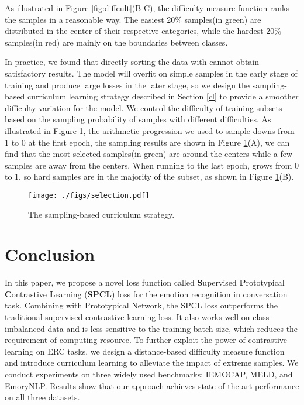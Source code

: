 \documentclass[11pt]{article}
\begin{document}
As illustrated in Figure \ref{fig:diffcult}(B-C), the difficulty measure function  ranks the samples in a reasonable way. The easiest 20\% samples(in green) are distributed in the center of their respective categories, while the hardest 20\% samples(in red) are mainly on the boundaries between classes. 

In practice, we found that directly sorting the data with  cannot obtain satisfactory results. The model will overfit on simple samples in the early stage of training and produce large losses in the later stage, so we design the sampling-based curriculum learning strategy described in Section \ref{cl} to provide a smoother difficulty variation for the model. We control the difficulty of training subsets based on the sampling probability of samples with different difficulties.  As illustrated in Figure \ref{fig:selection}, the arithmetic progression  we used to sample downs from 1 to 0 at the first epoch, the sampling results are shown in Figure \ref{fig:selection}(A), we can find that the most selected samples(in green) are around the centers while a few samples are away from the centers. When running to the last epoch,  grows from 0 to 1, so hard samples are in the majority of the subset, as shown in Figure \ref{fig:selection}(B).

\begin{figure}[t]
    \centering
    \texttt{[image: ./figs/selection.pdf]}
    \caption{The sampling-based curriculum strategy.}
    \label{fig:selection}
\end{figure}

\section{Conclusion}

In this paper, we propose a novel loss function called \textbf{S}upervised \textbf{P}rototypical \textbf{C}ontrastive \textbf{L}earning (\textbf{SPCL}) loss for the emotion recognition in conversation task. Combining with Prototypical Network, the SPCL loss outperforms the traditional supervised contrastive learning loss. It also works well on class-imbalanced data and is less sensitive to the training batch size, which reduces the requirement of computing resource. To further exploit the power of contrastive learning on ERC tasks, we design a distance-based difficulty measure function and introduce curriculum learning to alleviate
the impact of extreme samples. We conduct experiments on three widely used benchmarks: IEMOCAP, MELD, and EmoryNLP. Results show that our approach achieves state-of-the-art performance on all three datasets.
\end{document}
